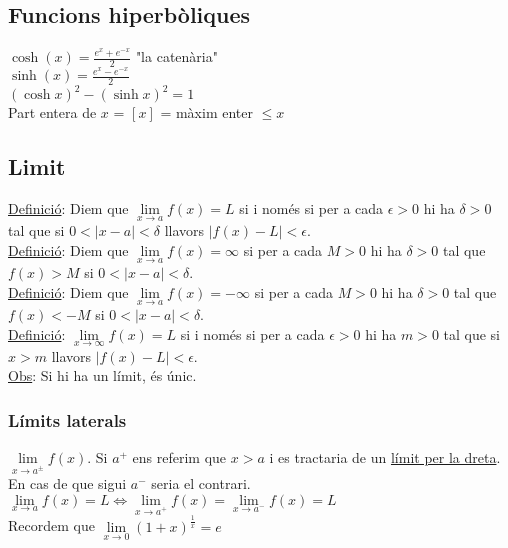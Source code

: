 \documentclass[../main.tex]{subfiles}
\begin{document}
    \subsection{Funcions hiperbòliques}
    $\cosh(x) = \frac{e^x+e^{-x}}{2}$ "la catenària"\\
    $\sinh(x) = \frac{e^x-e^{-x}}{2}$\\
    $(\cosh x)^2 - (\sinh x)^2 = 1$\\
    Part entera de $x$ = $[x]$ = màxim enter $\leq x$
    \subsection{Limit}
    \underline{Definició}: Diem que $\lim\limits_{x\rightarrow a}f(x) = L$ si i només si per a cada $\epsilon > 0$ hi ha $\delta > 0$ tal que si $0 < |x-a| < \delta$ llavors $|f(x)-L| < \epsilon$.\\
    \underline{Definició}: Diem que $\lim\limits_{x\rightarrow a} f(x) = \infty$ si per a cada $M > 0$ hi ha $\delta > 0$ tal que $f(x)>M$ si $0<|x-a|<\delta$.\\
    \underline{Definició}: Diem que $\lim\limits_{x\rightarrow a} f(x) = - \infty$ si per a cada $M > 0$ hi ha $\delta > 0$ tal que $f(x)<-M$ si $0<|x-a|<\delta$.\\
    \underline{Definició}: $\lim\limits_{x\rightarrow \infty} f(x)=L$ si i només si per a cada $\epsilon>0$ hi ha $m>0$ tal que si $x>m$ llavors $|f(x)-L| < \epsilon$.\\
    \underline{Obs}: Si hi ha un límit, és únic. 
    \subsubsection{Límits laterals}
    $\lim\limits_{x\rightarrow a^\pm} f(x)$. Si $a^+$ ens referim que $x > a$ i es tractaria de un \underline{límit per la dreta}. En cas de que sigui $a^-$ seria el contrari. \\
    $\lim\limits_{x\rightarrow a} f(x) = L \Longleftrightarrow \lim\limits_{x\rightarrow a^+} f(x) = \lim\limits_{x\rightarrow a^-} f(x) = L$\\
    Recordem que $\lim\limits_{x\rightarrow 0} (1+x)^\frac{1}{x} = e$\\
\end{document}
